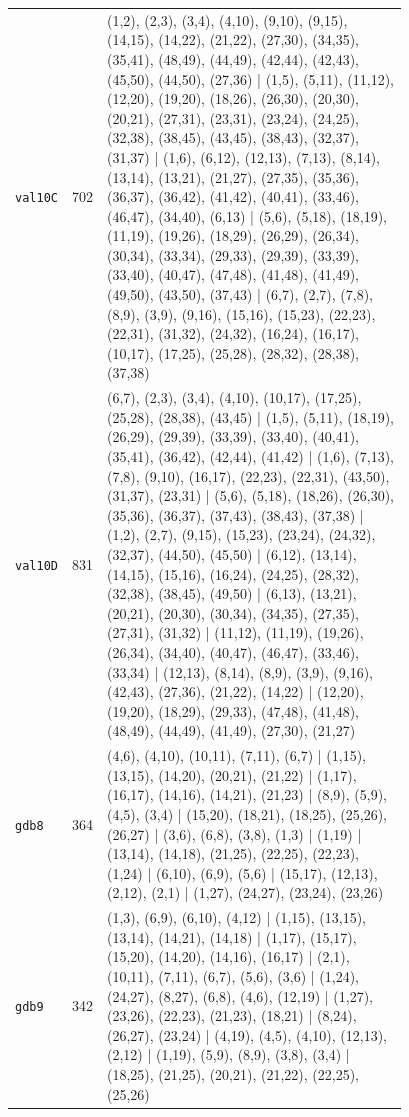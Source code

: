 \begin{landscape}
\begin{longtable}{lr>{\tiny\raggedright\arraybackslash}p{0.78\linewidth}}
\texttt{val10C} & 702 & (1,2), (2,3), (3,4), (4,10), (9,10), (9,15), (14,15), (14,22), (21,22), (27,30), (34,35), (35,41), (48,49), (44,49), (42,44), (42,43), (45,50), (44,50), (27,36) | (1,5), (5,11), (11,12), (12,20), (19,20), (18,26), (26,30), (20,30), (20,21), (27,31), (23,31), (23,24), (24,25), (32,38), (38,45), (43,45), (38,43), (32,37), (31,37) | (1,6), (6,12), (12,13), (7,13), (8,14), (13,14), (13,21), (21,27), (27,35), (35,36), (36,37), (36,42), (41,42), (40,41), (33,46), (46,47), (34,40), (6,13) | (5,6), (5,18), (18,19), (11,19), (19,26), (18,29), (26,29), (26,34), (30,34), (33,34), (29,33), (29,39), (33,39), (33,40), (40,47), (47,48), (41,48), (41,49), (49,50), (43,50), (37,43) | (6,7), (2,7), (7,8), (8,9), (3,9), (9,16), (15,16), (15,23), (22,23), (22,31), (31,32), (24,32), (16,24), (16,17), (10,17), (17,25), (25,28), (28,32), (28,38), (37,38) \\[2pt]
\texttt{val10D} & 831 & (6,7), (2,3), (3,4), (4,10), (10,17), (17,25), (25,28), (28,38), (43,45) | (1,5), (5,11), (18,19), (26,29), (29,39), (33,39), (33,40), (40,41), (35,41), (36,42), (42,44), (41,42) | (1,6), (7,13), (7,8), (9,10), (16,17), (22,23), (22,31), (43,50), (31,37), (23,31) | (5,6), (5,18), (18,26), (26,30), (35,36), (36,37), (37,43), (38,43), (37,38) | (1,2), (2,7), (9,15), (15,23), (23,24), (24,32), (32,37), (44,50), (45,50) | (6,12), (13,14), (14,15), (15,16), (16,24), (24,25), (28,32), (32,38), (38,45), (49,50) | (6,13), (13,21), (20,21), (20,30), (30,34), (34,35), (27,35), (27,31), (31,32) | (11,12), (11,19), (19,26), (26,34), (34,40), (40,47), (46,47), (33,46), (33,34) | (12,13), (8,14), (8,9), (3,9), (9,16), (42,43), (27,36), (21,22), (14,22) | (12,20), (19,20), (18,29), (29,33), (47,48), (41,48), (48,49), (44,49), (41,49), (27,30), (21,27) \\[2pt]
\texttt{gdb8} & 364 & (4,6), (4,10), (10,11), (7,11), (6,7) | (1,15), (13,15), (14,20), (20,21), (21,22) | (1,17), (16,17), (14,16), (14,21), (21,23) | (8,9), (5,9), (4,5), (3,4) | (15,20), (18,21), (18,25), (25,26), (26,27) | (3,6), (6,8), (3,8), (1,3) | (1,19) | (13,14), (14,18), (21,25), (22,25), (22,23), (1,24) | (6,10), (6,9), (5,6) | (15,17), (12,13), (2,12), (2,1) | (1,27), (24,27), (23,24), (23,26) \\[2pt]
\texttt{gdb9} & 342 & (1,3), (6,9), (6,10), (4,12) | (1,15), (13,15), (13,14), (14,21), (14,18) | (1,17), (15,17), (15,20), (14,20), (14,16), (16,17) | (2,1), (10,11), (7,11), (6,7), (5,6), (3,6) | (1,24), (24,27), (8,27), (6,8), (4,6), (12,19) | (1,27), (23,26), (22,23), (21,23), (18,21) | (8,24), (26,27), (23,24) | (4,19), (4,5), (4,10), (12,13), (2,12) | (1,19), (5,9), (8,9), (3,8), (3,4) | (18,25), (21,25), (20,21), (21,22), (22,25), (25,26) \\[2pt]

\end{longtable}
\end{landscape}
